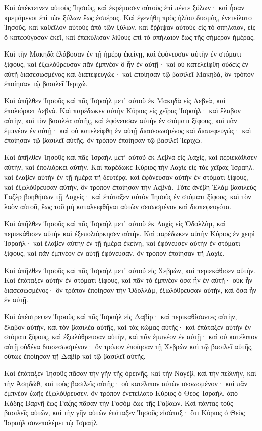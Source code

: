 {Καὶ ἀπέκτεινεν αὐτοὺς Ἰησοῦς, καὶ ἐκρέμασεν αὐτοὺς ἐπὶ πέντε ξύλων· καὶ ἦσαν κρεμάμενοι ἐπὶ τῶν ξύλων ἕως ἑσπέρας.
Καὶ ἐγενήθη πρὸς ἡλίου δυσμὰς, ἐνετείλατο Ἰησοῦς, καὶ καθεῖλον αὐτοὺς ἀπὸ τῶν ξύλων, καὶ ἔῤῥιψαν αὐτοὺς εἰς τὸ σπήλαιον, εἰς ὃ κατεφύγοσαν ἐκεῖ, καὶ ἐπεκύλισαν λίθους ἐπὶ τὸ σπήλαιον ἕως τῆς σήμερον ἡμέρας.
\par }{\PP {}Καὶ τὴν Μακηδὰ ἐλάβοσαν ἐν τῇ ἡμέρᾳ ἐκείνῃ, καὶ ἐφόνευσαν αὐτὴν ἐν στόματι ξίφους, καὶ ἐξωλόθρευσαν πᾶν ἐμπνέον ὃ ἦν ἐν αὐτῇ· καὶ οὐ κατελείφθη οὐδεὶς ἐν αὐτῇ διασεσωσμένος καὶ διαπεφευγώς· καὶ ἐποίησαν τῷ βασιλεῖ Μακηδὰ, ὃν τρόπον ἐποίησαν τῷ βασιλεῖ Ἱεριχώ.
\par }{\PP {}Καὶ ἀπῆλθεν Ἰησοῦς καὶ πᾶς Ἰσραὴλ μετʼ αὐτοῦ ἐκ Μακηδὰ εἰς Λεβνὰ, καὶ ἐπολιόρκει Λεβνά.
Καὶ παρέδωκεν αὐτὴν Κύριος εἰς χεῖρας Ἰσραήλ· καὶ ἔλαβον αὐτὴν, καὶ τὸν βασιλέα αὐτῆς, καὶ ἐφόνευσαν αὐτὴν ἐν στόματι ξίφους, καὶ πᾶν ἐμπνέον ἐν αὐτῇ· καὶ οὐ κατελείφθη ἐν αὐτῇ διασεσωσμένος καὶ διαπεφευγώς· καὶ ἐποίησαν τῷ βασιλεῖ αὐτῆς, ὃν τρόπον ἐποίησαν τῷ βασιλεῖ Ἱεριχώ.
\par }{\PP {}Καὶ ἀπῆλθεν Ἰησοῦς καὶ πᾶς Ἰσραὴλ μετʼ αὐτοῦ ἐκ Λεβνὰ εἰς Λαχὶς, καὶ περιεκάθισεν αὐτὴν, καὶ ἐπολιόρκει αὐτήν.
Καὶ παρέδωκε Κύριος τὴν Λαχὶς εἰς τὰς χεῖρας Ἰσραήλ. καὶ ἔλαβεν αὐτὴν ἐν τῇ ἡμέρᾳ τῇ δευτέρᾳ, καὶ ἐφόνευσαν αὐτὴν ἐν στόματι ξίφους, καὶ ἐξωλόθρευσαν αὐτὴν, ὃν τρόπον ἐποίησαν τὴν Λεβνά.
Τότε ἀνέβη Ἐλὰμ βασιλεὺς Γαζὲρ βοηθήσων τῇ Λαχείς· καὶ ἐπάταξεν αὐτὸν Ἰησοῦς ἐν στόματι ξίφους, καὶ τὸν λαὸν αὐτοῦ, ἕως τοῦ μὴ καταλειφθῆναι αὐτῶν σεσωσμένον καὶ διαπεφευγότα.
\par }{\PP {}Καὶ ἀπῆλθεν Ἰησοῦς καὶ πᾶς Ἰσραὴλ μετʼ αὐτοῦ ἐκ Λαχὶς εἰς Ὀδολλὰμ, καὶ περιεκάθισεν αὐτὴν καὶ ἐξεπολιόρκησεν αὐτήν.
Καὶ παρέδωκεν αὐτὴν Κύριος ἐν χειρὶ Ἰσραήλ· καὶ ἔλαβεν αὐτὴν ἐν τῇ ἡμέρᾳ ἐκείνῃ, καὶ ἐφόνευσεν αὐτὴν ἐν στόματι ξίφους, καὶ πᾶν ἐμπνέον ἐν αὐτῇ ἐφόνευσαν, ὃν τρόπον ἐποίησαν τῇ Λαχίς.
\par }{\PP {}Καὶ ἀπῆλθεν Ἰησοῦς καὶ πᾶς Ἰσραὴλ μετʼ αὐτοῦ εἰς Χεβρὼν, καὶ περιεκάθισεν αὐτήν.
Καὶ ἐπάταξεν αὐτὴν ἐν στόματι ξίφους, καὶ πᾶν τὸ ἐμπνέον ὅσα ἦν ἐν αὐτῇ· οὐκ ἦν διασεσωσμένος· ὃν τρόπον ἐποίησαν τὴν Ὀδολλὰμ, ἐξωλόθρευσαν αὐτὴν, καὶ ὅσα ἦν ἐν αὐτῇ.
\par }{\PP {}Καὶ ἀπέστρεψεν Ἰησοῦς καὶ πᾶς Ἰσραὴλ εἰς Δαβίρ· καὶ περικαθίσαντες αὐτὴν,
ἔλαβον αὐτὴν, καὶ τὸν βασιλέα αὐτῆς, καὶ τὰς κώμας αὐτῆς· καὶ ἐπάταξεν αὐτὴν ἐν στόματι ξίφους, καὶ ἐξωλόθρευσαν αὐτὴν, καὶ πᾶν ἐμπνέον ἐν αὐτῇ· καὶ οὐ κατέλιπον αὐτῇ οὐδένα διασεσωσμένον· ὃν τρόπον ἐποίησαν τῇ Χεβρὼν καὶ τῷ βασιλεῖ αὐτῆς, οὕτως ἐποίησαν τῇ Δαβὶρ καὶ τῷ βασιλεῖ αὐτῆς.
\par }{\PP {}Καὶ ἐπάταξεν Ἰησοῦς πᾶσαν τὴν γῆν τῆς ὀρεινῆς, καὶ τὴν Ναγὲβ, καὶ τὴν πεδινὴν, καὶ τὴν Ἀσηδὼθ, καὶ τοὺς βασιλεῖς αὐτῆς· οὐ κατέλιπον αὐτῶν σεσωσμένον· καὶ πᾶν ἐμπνέον ζωῆς ἐξωλόθρευσεν, ὃν τρόπον ἐνετείλατο Κύριος ὁ Θεὸς Ἰσραὴλ,
ἀπὸ Κάδης Βαρνῆ ἕως Γάζης πᾶσαν τὴν Γοσὸμ ἕως τῆς Γαβαών.
Καὶ πάντας τοὺς βασιλεῖς αὐτῶν, καὶ τὴν γῆν αὐτῶν ἐπάταξεν Ἰησοῦς εἰσάπαξ· ὅτι Κύριος ὁ Θεὸς Ἰσραὴλ συνεπολέμει τῷ Ἰσραήλ.

}
